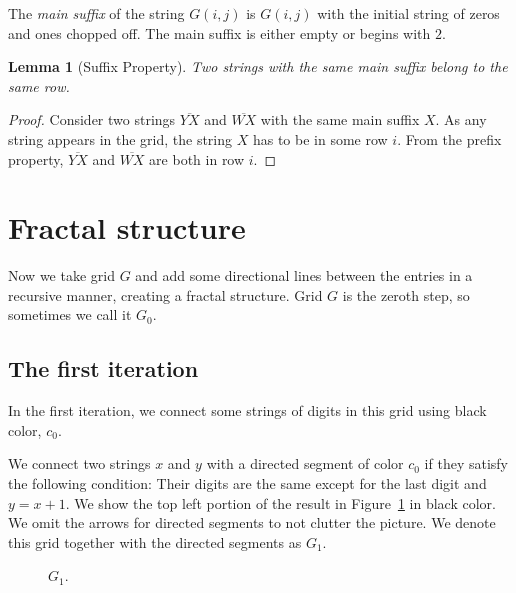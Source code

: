 \documentclass[12pt,reqno]{article}
\theoremstyle{plain}
\newtheorem{lemma}[theorem]{Lemma}
\theoremstyle{definition}
\theoremstyle{remark}
\begin{document}
The \textit{main suffix} of the string $G(i,j)$ is $G(i,j)$ with the initial string of zeros and ones chopped off. The main suffix is either empty or begins with $2$.

\begin{lemma}[Suffix Property]
Two strings with the same main suffix belong to the same row. 
\end{lemma}
\begin{proof}
Consider two strings $\overline{YX}$ and $\overline{WX}$ with the same main suffix $X$. As any string appears in the grid, the string $X$ has to be in some row $i$. From the prefix property, $\overline{YX}$ and $\overline{WX}$ are both in row $i$.
\end{proof}



\section{Fractal structure}\label{sec:fractalstructure}

Now we take grid $G$ and add some directional lines between the entries in a recursive manner, creating a fractal structure. Grid $G$ is the zeroth step, so sometimes we call it  $G_0$.

\subsection{The first iteration}

In the first iteration, we connect some strings of digits in this grid using black color, $c_0$.

We connect two strings $x$ and $y$ with a directed segment of color $c_0$ if they satisfy the following condition: Their digits are the same except for the last digit and $y = x+1$. We show the top left portion of the result in Figure~\ref{fig:g1} in black color. We omit the arrows for directed segments to not clutter the picture. We denote this grid together with the directed segments as $G_1$.

\begin{figure}[ht]
    \centering
{}
    \caption{$G_1$.}
    \label{fig:g1}
\end{figure}
\end{document}
